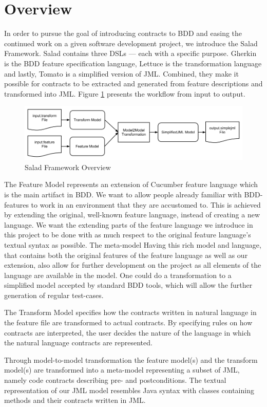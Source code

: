 \section{Overview}

In order to pursue the goal of introducing contracts to BDD and easing the continued work on a given software development project, we introduce the Salad Framework. Salad contains three DSLs --- each with a specific purpose. Gherkin is the BDD feature specification language, Lettuce is the transformation language and lastly, Tomato is a simplified version of JML.  Combined, they make it possible for contracts to be extracted and generated from feature descriptions and transformed into JML. Figure \ref{fig:saladoverview} presents the workflow from input to output.

\begin{figure}
	\begin{center}
		\includegraphics[scale=0.46]{images/framework_overview.png}
	\end{center}
	\caption{Salad Framework Overview}
	\label{fig:saladoverview}
\end{figure}

The Feature Model represents an extension of Cucumber feature language which is the main artifact in BDD.
We want to allow people already familiar with BDD-features to work in an environment that they are accustomed to. 
This is achieved by extending the original, well-known feature language, instead of creating a new language. 
We want the extending parts of the feature language we introduce in this project to be done with as much respect to the original feature language's
textual syntax as possible. The meta-model Having this rich model and language, that contains both the original features of the feature language as 
well as our extension, also allow for further development on the project as all elements of the language are available in the model. 
One could do a transformation to a simplified model accepted by standard BDD tools, which will allow the further generation of regular test-cases.

The Transform Model specifies how the contracts written in natural language in the feature file are transformed to actual contracts.
By specifying rules on how contracts are interpreted, the user decides the nature of the language in which the natural language contracts are represented. 

Through model-to-model transformation the feature model(s) and the transform model(s) are transformed into a meta-model representing a subset of JML,
namely code contracts describing pre- and postconditions. The textual representation of our JML model resembles Java syntax with classes containing methods and
their contracts written in JML.

